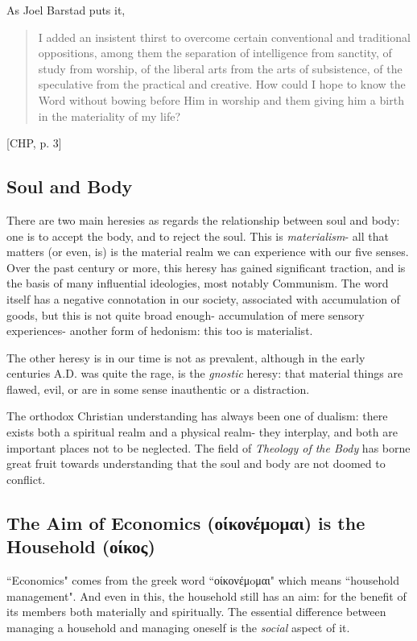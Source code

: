 \documentclass[letterpaper]{article}
\begin{document}
As Joel Barstad puts it,

\begin{quote}
  I added an insistent thirst to overcome certain conventional and traditional oppositions, among them the separation of intelligence from sanctity, of study from worship, of the liberal arts from the arts of subsistence, of the speculative from the practical and creative. How could I hope to know the Word without bowing before Him in worship and them giving him a birth in the materiality of my life?
\end{quote} [CHP, p. 3]

\subsection{Soul and Body}

There are two main heresies as regards the relationship between soul and body: one is to accept the body, and to reject the soul. This is \textit{materialism}- all that matters (or even, is) is the material realm we can experience with our five senses. Over the past century or more, this heresy has gained significant traction, and is the basis of many influential ideologies, most notably Communism. The word itself has a negative connotation in our society, associated with accumulation of goods, but this is not quite broad enough- accumulation of mere sensory experiences- another form of hedonism: this too is materialist.

The other heresy is in our time is not as prevalent, although in the early centuries A.D. was quite the rage, is the \textit{gnostic} heresy: that material things are flawed, evil, or are in some sense inauthentic or a distraction.

The orthodox Christian understanding has always been one of dualism: there exists both a spiritual realm and a physical realm- they interplay, and both are important places not to be neglected. The field of \textit{Theology of the Body} has borne great fruit towards understanding that the soul and body are not doomed to conflict.

\subsection{The Aim of Economics (οίκονέμoμαι) is the Household (οίκος)}

``Economics" comes from the greek word ``οίκονέμoμαι" which means ``household management". And even in this, the household still has an aim: for the benefit of its members both materially and spiritually. The essential difference between managing a household and managing oneself is the \textit{social} aspect of it.
\end{document}
